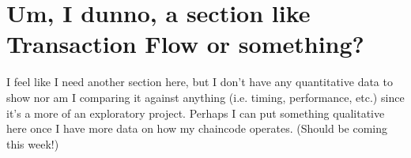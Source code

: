 \section{Um, I dunno, a section like Transaction Flow or something?}
	\hspace{10mm}I feel like I need another section here, but I don't have any quantitative data to show nor am I comparing it against anything (i.e. timing, performance, etc.) since it's a more of an exploratory project. Perhaps I can put something qualitative here once I have more data on how my chaincode operates. (Should be coming this week!)\\